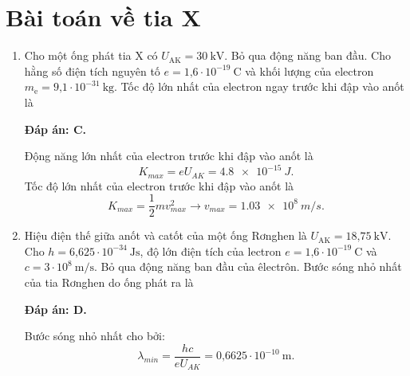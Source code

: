 \section{Bài toán về tia X}
\begin{enumerate}[label=\bfseries Câu \arabic*:]
	\item {} 
	\cauhoi
	{Cho một ống phát tia X có $U_\text{AK}=30\ \text{kV}$. Bỏ qua động năng ban đầu. Cho hằng số điện tích nguyên tố $e=\text{1,6}\cdot 10^{-19}\ \text{C}$ và khối lượng của electron $m_\text{e}=\text{9,1}\cdot 10^{-31}\ \text{kg}$. Tốc độ lớn nhất của electron ngay trước khi đập vào anốt là
	}
	
	\loigiai
	{		\textbf{Đáp án: C.}
		
Động năng lớn nhất của electron trước khi đập vào anốt là
$$
	K_{max} = eU_{AK} = \SI{4,8 e-15}{J}.
$$
Tốc độ lớn nhất của electron trước khi đập vào anốt là
$$
	K_{max} = \dfrac{1}{2}mv_{max}^{2} \rightarrow v_{max} = \SI{1,03 e8}{m/s}.
$$
		
	}
	
	\item {} 
	\cauhoi
	{Hiệu điện thế giữa anốt và catốt của một ống Rơnghen là $U_\text{AK}=\text{18,75}\ \text{kV}$. Cho $h=\text{6,625}\cdot 10^{-34}\ \text{Js}$, độ lớn điện tích của lectron $e=\text{1,6}\cdot 10^{-19}\ \text{C}$ và $c=3\cdot 10^8\ \text{m/s}$. Bỏ qua động năng ban đầu của êlectrôn. Bước sóng nhỏ nhất của tia Rơnghen do ống phát ra là
	}
	
	\loigiai
	{		\textbf{Đáp án: D.}
		
Bước sóng nhỏ nhất cho bởi:
$$
	\lambda_{min} = \dfrac{hc}{eU_{AK}} = \text{0,6625}\cdot 10^{-10}\ \text{m}.
$$
		
}
\end{enumerate}
